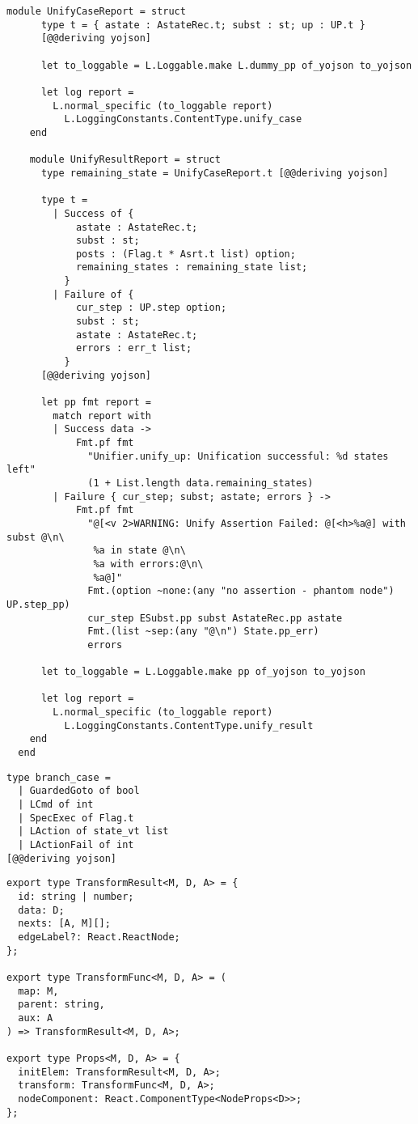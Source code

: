 \begin{lstlisting}[caption={
  Logging types for unification, inside the \texttt{Unifier} module
  \label{lst:unifier-logging}}, style=code]
    module UnifyCaseReport = struct
      type t = { astate : AstateRec.t; subst : st; up : UP.t }
      [@@deriving yojson]

      let to_loggable = L.Loggable.make L.dummy_pp of_yojson to_yojson

      let log report =
        L.normal_specific (to_loggable report)
          L.LoggingConstants.ContentType.unify_case
    end

    module UnifyResultReport = struct
      type remaining_state = UnifyCaseReport.t [@@deriving yojson]

      type t =
        | Success of {
            astate : AstateRec.t;
            subst : st;
            posts : (Flag.t * Asrt.t list) option;
            remaining_states : remaining_state list;
          }
        | Failure of {
            cur_step : UP.step option;
            subst : st;
            astate : AstateRec.t;
            errors : err_t list;
          }
      [@@deriving yojson]

      let pp fmt report =
        match report with
        | Success data ->
            Fmt.pf fmt
              "Unifier.unify_up: Unification successful: %d states left"
              (1 + List.length data.remaining_states)
        | Failure { cur_step; subst; astate; errors } ->
            Fmt.pf fmt
              "@[<v 2>WARNING: Unify Assertion Failed: @[<h>%a@] with subst @\n\
               %a in state @\n\
               %a with errors:@\n\
               %a@]"
              Fmt.(option ~none:(any "no assertion - phantom node") UP.step_pp)
              cur_step ESubst.pp subst AstateRec.pp astate
              Fmt.(list ~sep:(any "@\n") State.pp_err)
              errors

      let to_loggable = L.Loggable.make pp of_yojson to_yojson

      let log report =
        L.normal_specific (to_loggable report)
          L.LoggingConstants.ContentType.unify_result
    end
  end
\end{lstlisting}

\begin{lstlisting}[caption={
  The \texttt{branch\_case} type
  \label{lst:branch-case}}, style=code, numbers=none]
type branch_case =
  | GuardedGoto of bool
  | LCmd of int
  | SpecExec of Flag.t
  | LAction of state_vt list
  | LActionFail of int
[@@deriving yojson]
\end{lstlisting}

\begin{lstlisting}[caption={
  The required types for the \texttt{<TreeMapView />} component
  \label{lst:treemapview-types}}, style=code, numbers=none]
export type TransformResult<M, D, A> = {
  id: string | number;
  data: D;
  nexts: [A, M][];
  edgeLabel?: React.ReactNode;
};

export type TransformFunc<M, D, A> = (
  map: M,
  parent: string,
  aux: A
) => TransformResult<M, D, A>;

export type Props<M, D, A> = {
  initElem: TransformResult<M, D, A>;
  transform: TransformFunc<M, D, A>;
  nodeComponent: React.ComponentType<NodeProps<D>>;
};
\end{lstlisting}